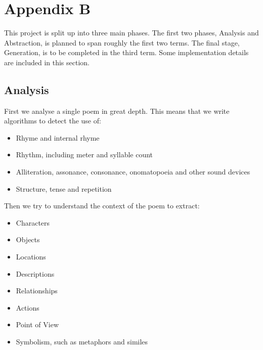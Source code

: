 \chapter{Appendix B}

This project is split up into three main phases. The first two phases, Analysis and Abstraction, is planned to span roughly the first two terms. The final stage, Generation, is to be completed in the third term. Some implementation details are included in this section.
\section{Analysis}

First we analyse a single poem in great depth. This means that we write algorithms to detect the use of:
\begin{itemize}
\setlength{\itemsep}{0pt}
\item{Rhyme and internal rhyme}
\item{Rhythm, including meter and syllable count}
\item{Alliteration, assonance, consonance, onomatopoeia and other sound devices}
\item{Structure, tense and repetition}
\end{itemize}

Then we try to understand the context of the poem to extract:
\begin{itemize}
\setlength{\itemsep}{0pt}
\item{Characters}
\item{Objects}
\item{Locations}
\item{Descriptions}
\item{Relationships}
\item{Actions}
\item{Point of View}
\item{Symbolism, such as metaphors and similes}
\end{itemize}

